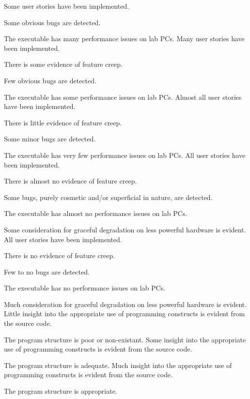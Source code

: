\documentclass{../fal_assignment}
\begin{document}
\begin{markingrubric}
        \grade Some user stories have been implemented.
            \par Some obvious bugs are detected.
            \par The executable has many performance issues on lab PCs.
        \grade Many user stories have been implemented.
            \par There is some evidence of feature creep.
            \par Few obvious bugs  are detected.
            \par The executable has some performance issues on lab PCs.
        \grade Almost all user stories have been implemented.
            \par There is little evidence of feature creep.
            \par Some minor bugs  are detected.
            \par The executable has very few performance issues on lab PCs.
        \grade All user stories have been implemented.
            \par There is almost no evidence of feature creep.
            \par Some bugs, purely cosmetic and/or superficial in nature, are detected.
            \par The executable has almost no performance issues on lab PCs.
            \par Some consideration for graceful degradation on less powerful hardware is evident.
        \grade All user stories have been implemented.
            \par There is no evidence of feature creep.
            \par Few to no bugs are detected.
            \par The executable has no performance issues on lab PCs.
            \par Much consideration for graceful degradation on less powerful hardware is evident.
%
        \grade \fail Little insight into the appropriate use of programming constructs is evident from the source code.
            \par The program structure is poor or non-existant.
        \grade Some insight into the appropriate use of programming constructs is evident from the source code.
            \par The program structure is adequate.
        \grade Much insight into the appropriate use of programming constructs is evident from the source code.
            \par The program structure is appropriate.

\end{markingrubric}
\end{document}
